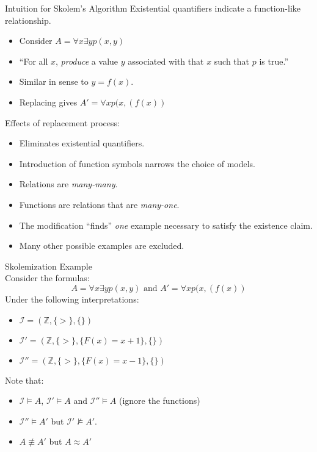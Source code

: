 \documentclass[style=sailor,size=12pt,mode=present]{powerdot}
\theoremstyle{definition}
\newenvironment{ex}[1]
  {\renewcommand\theinnerexample{#1}\innerexample}
  {\endinnerexample}
\newcommand{\bb}[1]{\mathbb{#1}}
\newcommand{\Z}{\bb{Z}}
\begin{document}
\begin{wideslide}[bm=,toc=]{Intuition for Skolem's Algorithm}
Existential quantifiers indicate a function-like relationship.
\begin{itemize}
\item Consider $A = \forall x \exists y p(x,y)$
\item ``For all $x$, \emph{produce} a value $y$ associated with that $x$ such
that $p$ is true.''
\item Similar in sense to $y = f(x)$.
\item Replacing gives $A' = \forall x p(x,(f(x))$
\end{itemize}
\vspace{2ex}
Effects of replacement process:
\begin{itemize}
\item Eliminates existential quantifiers.
\item Introduction of function symbols narrows the choice of models.
\item Relations are \emph{many-many}.
\item Functions are relations that are \emph{many-one}.
\item The modification ``finds'' \emph{one} example necessary to satisfy the existence claim.
\item Many other possible examples are excluded.
\end{itemize}
\end{wideslide}

\begin{wideslide}[bm=,toc=]{Skolemization Example}
\begin{ex}{9.14}
~\\Consider the formulas:
\vspace{-2ex}
\[A = \forall x \exists y p(x,y) \text{ and } A' = \forall x p(x,(f(x))\]
\end{ex}
\vspace{-2ex}
Under the following interpretations:
\begin{itemize}
\item $\mathcal{I} = (\Z,\{>\},\{\})$
\item $\mathcal{I}' = (\Z,\{>\},\{F(x) = x + 1\},\{\})$
\item $\mathcal{I}'' = (\Z,\{>\},\{F(x) = x - 1\},\{\})$
\end{itemize}
Note that:
\begin{itemize}
\item $\mathcal{I} \models A$, $\mathcal{I}' \models A$ and $\mathcal{I}''
\models A$ (ignore the functions)
\item $\mathcal{I}'' \models A'$ but $\mathcal{I}' \not \models A'$. 
\item $A \not \equiv A'$ but $A \approx A'$ 
\end{itemize}
\end{wideslide}
\end{document}
